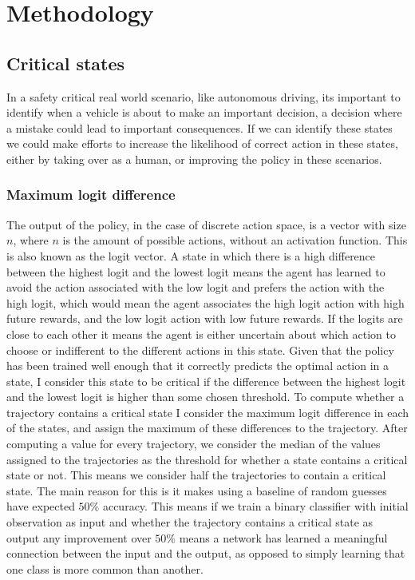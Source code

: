 \documentclass[UKenglish]{uiomasterthesis}
\begin{document}
\medskip
\chapter{Methodology}

\section{Critical states}
In a safety critical real world scenario, like autonomous driving, its important to identify when a vehicle is about to make an important decision, a decision where a mistake could lead to important consequences. If we can identify these states we could make efforts to increase the likelihood of correct action in these states, either by taking over as a human, or improving the policy in these scenarios.

\subsection{Maximum logit difference}
The output of the policy, in the case of discrete action space, is a vector with size $n$, where $n$ is the amount of possible actions, without an activation function. This is also known as the logit vector. A state in which there is a high difference between the highest logit and the lowest logit means the agent has learned to avoid the action associated with the low logit and prefers the action with the high logit, which would mean the agent associates the high logit action with high future rewards, and the low logit action with low future rewards. If the logits are close to each other it means the agent is either uncertain about which action to choose or indifferent to the different actions in this state. Given that the policy has been trained well enough that it correctly predicts the optimal action in a state, I consider this state to be critical if the difference between the highest logit and the lowest logit is higher than some chosen threshold.
To compute whether a trajectory contains a critical state I consider the maximum logit difference in each of the states, and assign the maximum of these differences to the trajectory. After computing a value for every trajectory, we consider the median of the values assigned to the trajectories as the threshold for whether a state contains a critical state or not. This means we consider half the trajectories to contain a critical state. The main reason for this is it makes using a baseline of random guesses have expected $50\%$ accuracy. This means if we train a binary classifier with initial observation as input and whether the trajectory contains a critical state as output any improvement over $50\%$ means a network has learned a meaningful connection between the input and the output, as opposed to simply learning that one class is more common than another.
\end{document}
